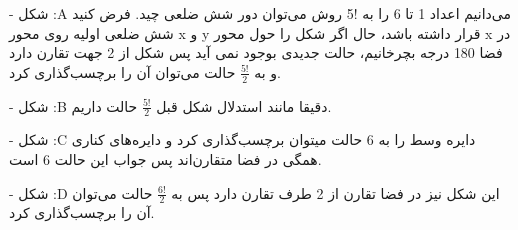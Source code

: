 -
شکل
:A
\p
می‌دانیم اعداد 1 تا 6 را به !5 روش می‌توان دور شش ضلعی چید. فرض کنید شش ضلعی اولیه روی محور x و y قرار داشته باشد، حال اگر شکل را حول محور x در فضا 180 درجه بچرخانیم، حالت جدیدی بوجود نمی آید پس شکل از 2 جهت تقارن دارد و به
$\frac{5!}{2}$
حالت می‌توان آن را برچسب‌گذاری کرد.

-
شکل
:B
\p
دقیقا مانند استدلال شکل قبل
$\frac{5!}{2}$
حالت داریم.

-
شکل
:C
\p
دایره وسط را به 6 حالت میتوان برچسب‌گذاری کرد و دایره‌های کناری همگی در فضا متقارن‌اند پس جواب این حالت 6 است.

-
شکل 
:D
\p
این شکل نیز در فضا تقارن از 2 طرف تقارن دارد پس به 
$\frac{6!}{2}$
حالت می‌توان آن را برچسب‌گذاری کرد.	